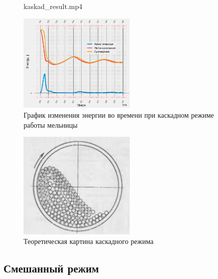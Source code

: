 \documentclass[c]{beamer}  %
\begin{document}
\begin{frame}
\frametitle{\insertsection} 
\framesubtitle{\insertsubsection}
	\begin{figure}[ht]
     		{kaskad_result.mp4}
\end{figure}
	 {
	\begin{figure}[H]
	\centering
	\includegraphics[width=0.5\textwidth]{kaskad_energy}
	\caption{График изменения энергии во времени при каскадном режиме работы мельницы}
	\label{pic:kaskad_energy}
\end{figure} 
}
{
\begin{figure}[H]
	\centering
	\includegraphics[width=0.5\textwidth]{kaskad_theory} 
	\caption{Теоретическая картина каскадного режима}
\end{figure}
}
\end{frame}










\subsection{Смешанный режим}
\end{document}

